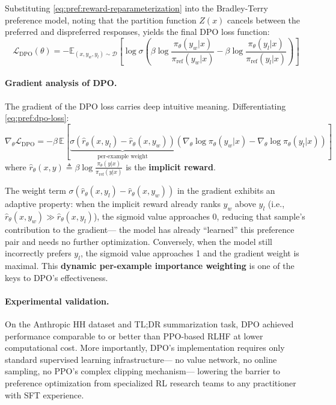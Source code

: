 Substituting \cref{eq:pref:reward-reparameterization} into the Bradley-Terry preference model,
noting that the partition function $Z(x)$ cancels between the preferred and dispreferred responses,
yields the final DPO loss function:
\begin{equation}
\label{eq:pref:dpo-loss}
\boxed{
\mathcal{L}_{\text{DPO}}(\theta) = -\mathbb{E}_{(x, y_w, y_l) \sim \mathcal{D}} \left[
  \log \sigma\!\left(
    \beta \log \frac{\pi_\theta(y_w|x)}{\pi_{\text{ref}}(y_w|x)}
    - \beta \log \frac{\pi_\theta(y_l|x)}{\pi_{\text{ref}}(y_l|x)}
  \right)
\right]
}
\end{equation}

\paragraph{Gradient analysis of DPO.}
The gradient of the DPO loss carries deep intuitive meaning. Differentiating \cref{eq:pref:dpo-loss}:
\begin{equation}
\label{eq:pref:dpo-gradient}
\nabla_\theta \mathcal{L}_{\text{DPO}} = -\beta\, \mathbb{E}\!\left[
  \underbrace{\sigma\!\left(\hat{r}_\theta(x, y_l) - \hat{r}_\theta(x, y_w)\right)}_{\text{per-example weight}}
  \left(
    \nabla_\theta \log \pi_\theta(y_w|x) - \nabla_\theta \log \pi_\theta(y_l|x)
  \right)
\right]
\end{equation}
where $\hat{r}_\theta(x, y) \triangleq \beta \log \frac{\pi_\theta(y|x)}{\pi_{\text{ref}}(y|x)}$
is the \textbf{implicit reward}.

The weight term $\sigma(\hat{r}_\theta(x, y_l) - \hat{r}_\theta(x, y_w))$ in the gradient exhibits an adaptive property:
when the implicit reward already ranks $y_w$ above $y_l$ (i.e., $\hat{r}_\theta(x, y_w) \gg \hat{r}_\theta(x, y_l)$),
the sigmoid value approaches 0, reducing that sample's contribution to the gradient---
the model has already ``learned'' this preference pair and needs no further optimization.
Conversely, when the model still incorrectly prefers $y_l$, the sigmoid value approaches 1 and the gradient weight is maximal.
This \textbf{dynamic per-example importance weighting} is one of the keys to DPO's effectiveness.

\paragraph{Experimental validation.}
On the Anthropic HH dataset and TL;DR summarization task,
DPO achieved performance comparable to or better than PPO-based RLHF at lower computational cost.
More importantly, DPO's implementation requires only standard supervised learning infrastructure---
no value network, no online sampling, no PPO's complex clipping mechanism---
lowering the barrier to preference optimization from specialized RL research teams to any practitioner with SFT experience.

